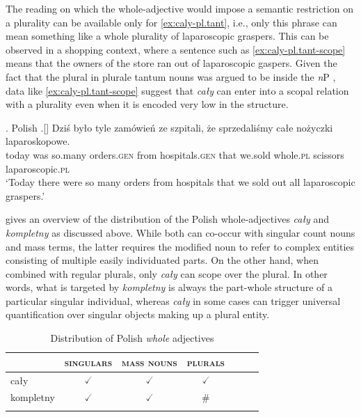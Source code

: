 The reading on which the whole-adjective would impose a semantic restriction on a plurality can be available only for \ref{ex:caly-pl.tant}, i.e., only this phrase can mean something like a whole plurality of laparoscopic graspers. This can be observed in a shopping context, where a sentence such as \ref{ex:caly-pl.tant-scope} means that the owners of the store ran out of laparoscopic gaspers. Given the fact that the plural in plurale tantum nouns was argued to be inside the \textit{n}P \citep[see, e.g.,][]{acquaviva2008lexical,alexiadou2011plural,smith2015feature,smith2017lexical}, data like \ref{ex:caly-pl.tant-scope} suggest that \textit{cały} can enter into a scopal relation with a plurality even when it is encoded very low in the structure.

\ex. Polish\label{ex:caly-pl.tant-scope}
\bg.[] Dziś było tyle zamówień ze szpitali, że sprzedaliśmy całe nożyczki laparoskopowe.\\
today was so.many orders\textsc{.gen} from hospitals\textsc{.gen} that we.sold whole\textsc{.pl} scissors laparoscopic\textsc{.pl}\\
`Today there were so many orders from hospitals that we sold out all laparoscopic graspers.' 

 gives an overview of the distribution of the Polish whole-adjectives \textit{cały} and \textit{kompletny} as discussed above. While both can co-occur with singular count nouns and mass terms, the latter requires the modified noun to refer to complex entities consisting of multiple easily individuated parts. On the other hand, when combined with regular plurals, only \textit{cały} can scope over the plural. In other words, what is targeted by \textit{kompletny} is always the part-whole structure of a particular singular individual, whereas \textit{cały} in some cases can trigger universal quantification over singular objects making up a plural entity. 

		\begin{table}[h]
			\centering
			\begin{tabular}{lcccccc}
				\lsptoprule
				& \textsc{singulars} & \textsc{mass nouns}   & \textsc{plurals} \\ \midrule
				cały & $\checked$  & $\checked$    & $\checked$            \\ 
				kompletny & $\checked$    &  $\checked$    & \#            \\
				\lspbottomrule
			\end{tabular}
			\caption{Distribution of Polish \textit{whole} adjectives}
            \label{tab:distribution-of-polish-whole-adjectives}
		\end{table}

